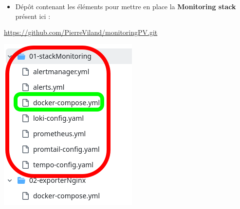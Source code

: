 \documentclass[french, 12pt]{article}%
\newcommand{\itemE}{\item[$\bullet$]}
\begin{document}
\begin{minipage}{0.6\linewidth}
\begin{itemize}
\itemE Dépôt contenant les éléments pour mettre en place la \textbf{Monitoring stack} présent ici : 
\end{itemize}
\href{https://github.com/PierreViland/monitoringPV.git}{https://github.com/PierreViland/monitoringPV.git}
\end{minipage}
\begin{minipage}{0.39\linewidth}

\begin{center}
\includegraphics[scale=0.5]{./ressource/depo_global}
\end{center}
\end{minipage}
\end{document}
